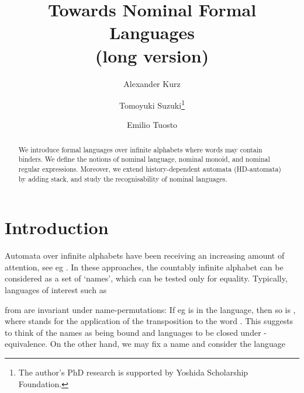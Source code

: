 \documentclass[runningheads,a4paper]{llncs}
\newcommand{\comment}[1]{}
\begin{document}
\mainmatter  

\title{Towards Nominal Formal Languages \\ (long version)}


\author{Alexander Kurz \and Tomoyuki Suzuki\thanks{The author's PhD research is supported by Yoshida Scholarship Foundation.} \and Emilio Tuosto}





\maketitle

\begin{abstract}
  We introduce formal languages over infinite alphabets where words
  may contain binders. We define the notions of nominal language,
  nominal monoid, and nominal regular expressions.  Moreover, we
  extend history-dependent automata (HD-automata) by adding stack, and
  study the recognisability of nominal languages.
\comment{
  Finally, we show how our framework can be used to model
  correctness of a cryptographic protocol models in a -like
  calculus.
}

\end{abstract}


\section{Introduction}

Automata over infinite alphabets have been receiving an increasing
amount of attention, see eg
\cite{kaminskifrancez94,segoufin:csl06,bojanczyk:stacs11,tze11}. In
these approaches, the countably infinite alphabet  can be
considered as a set of `names', which can be tested only for
equality. Typically, languages of interest such as

from \cite{kaminskifrancez94} are invariant under name-permutations:
If eg  is in the language, then so is ,
where  stands for the application of the transposition
 to the word . This suggests to think of the names as
being bound and languages to be closed under -equivalence. On
the other hand, we may fix a name  and consider the language
\end{document}
